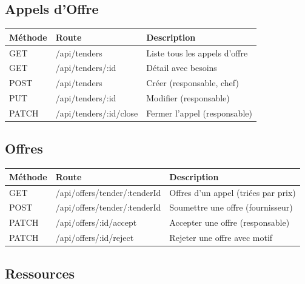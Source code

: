 \subsection{Appels d'Offre}

\begin{table}[h!]
\centering
\begin{tabularx}{\textwidth}{|l|l|X|}
\hline
\textbf{Méthode} & \textbf{Route} & \textbf{Description} \\
\hline
GET & /api/tenders & Liste tous les appels d'offre \\
\hline
GET & /api/tenders/:id & Détail avec besoins \\
\hline
POST & /api/tenders & Créer (responsable, chef) \\
\hline
PUT & /api/tenders/:id & Modifier (responsable) \\
\hline
PATCH & /api/tenders/:id/close & Fermer l'appel (responsable) \\
\hline
\end{tabularx}
\end{table}

\subsection{Offres}

\begin{table}[h!]
\centering
\begin{tabularx}{\textwidth}{|l|l|X|}
\hline
\textbf{Méthode} & \textbf{Route} & \textbf{Description} \\
\hline
GET & /api/offers/tender/:tenderId & Offres d'un appel (triées par prix) \\
\hline
POST & /api/offers/tender/:tenderId & Soumettre une offre (fournisseur) \\
\hline
PATCH & /api/offers/:id/accept & Accepter une offre (responsable) \\
\hline
PATCH & /api/offers/:id/reject & Rejeter une offre avec motif \\
\hline
\end{tabularx}
\end{table}

\subsection{Ressources}

